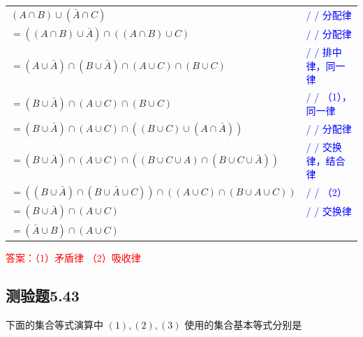\documentclass[UTF8, heading=true]{ctexart}
\begin{document}
\begin{table}[H]
  \centering
  \renewcommand{\arraystretch}{1.5}
  \begin{tabular}{ll}
    $(A \cap B) \cup (\bar{A} \cap C)$ & \textcolor{blue}{/ / 分配律} \\
    $=((A \cap B) \cup \bar{A}) \cap ((A \cap B) \cup C)$ & \textcolor{blue}{/ / 分配律} \\
    $=(A \cup \bar{A}) \cap (B \cup \bar{A}) \cap (A \cup C) \cap (B \cup C)$ & \textcolor{blue}{/ / 排中律，同一律} \\
    $=(B \cup \bar{A}) \cap (A \cup C) \cap (B \cup C)$ & \textcolor{blue}{/ / （1），同一律} \\
    $=(B \cup \bar{A}) \cap (A \cup C) \cap ((B \cup C) \cup (A \cap \bar{A}))$ & \textcolor{blue}{/ / 分配律} \\
    $=(B \cup \bar{A}) \cap (A \cup C) \cap ((B \cup C \cup A) \cap (B \cup C \cup \bar{A}))$ & \textcolor{blue}{/ / 交换律，结合律} \\
    $=((B \cup \bar{A}) \cap (B \cup \bar{A} \cup C)) \cap ((A \cup C) \cap (B \cup A \cup C))$ & \textcolor{blue}{/ / （2）} \\
    $=(B \cup \bar{A}) \cap (A \cup C)$ & \textcolor{blue}{/ / 交换律} \\
    $=(\bar{A} \cup B) \cap (A \cup C)$ &  \\
  \end{tabular}
\end{table}


\textcolor{red}
{
  答案：（1）矛盾律
  （2）吸收律
}


\subsection{测验题5.43}

下面的集合等式演算中 $(1),(2),(3)$ 使用的集合基本等式分别是

\clearpage
\end{document}

